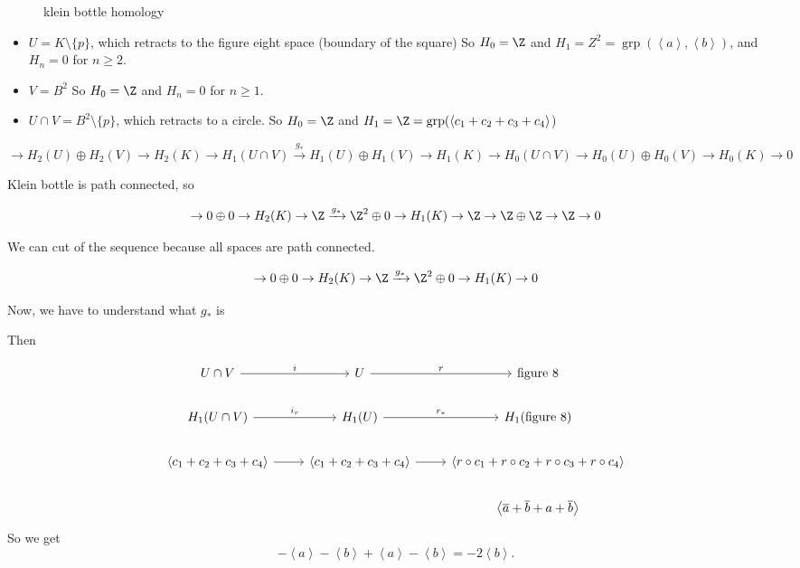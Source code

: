 \begin{figure}[H]
    \centering
    \caption{klein bottle homology}
    \label{fig:klein-bottle-homology}
\end{figure}

\begin{itemize}
    \item $U = K \setminus \{p\}$, which retracts to the figure eight space (boundary of the square)
        So $H_0 = \Z$ and $H_1  = Z^2 = \operatorname{grp}(\left<a \right>, \left<b \right>)$, and $H_n =0$ for  $n \ge  2$.
    \item $V = B^2$
        So $H_0 = \Z$ and $H_n = 0$ for  $n \ge 1 $.
    \item $U \cap V = B^2 \setminus \{p\}$, which retracts to a circle.
        So $H_0 = \Z$ and $H_1 = \Z = \operatorname{grp}(\left<c_1 + c_2 + c_3 + c_4\right>$)
\end{itemize}

\centerline{$
            \to  H_2(U) \oplus H_2(V) \to  H_2(K) \to  H_1(U \cap V) \xrightarrow{g_*}   H_1(U) \oplus H_1(V) \to  H_1(K) \to  H_0(U \cap  V) \to  H_0(U) \oplus H_0(V) \to  H_0(K) \to  0
        $}

        Klein bottle is path connected,  so

        \[
                    \to  0 \oplus 0 \to  H_2(K) \to  \Z \xrightarrow{g_*}   \Z^2\oplus 0 \to  H_1(K) \to  \Z \to  \Z  \oplus \Z \to  \Z \to  0
        \]

        We can cut of the sequence  because all spaces are path connected.

        \[
                    \to  0 \oplus 0 \to  H_2(K) \to  \Z \xrightarrow{g_*}   \Z^2\oplus 0 \to  H_1(K) \to  0
        \]

        Now, we have to understand what $g_*$ is

        Then

        \[
            \begin{tikzcd}
                U \cap V \arrow[r, "i"] & U \arrow[r, "r"] & \text{figure 8}\\
                H_1(U \cap V) \arrow[r, "i_r"] & H_1(U) \arrow[r, "r_*"] & H_1(\text{figure 8})\\
                \left<c_1 + c_2 + c_3 + c_4 \right> \arrow[r, ""] & \left<c_1+ c_2 +c_3 +c_4 \right> \arrow[r, ""] & \left<r  \circ  c_1 + r  \circ  c_2 + r  \circ  c_3 + r  \circ  c_4 \right>\\
                                      && \left<\overline{a} + \overline{b} + a + \overline{b} \right>
            \end{tikzcd}
        \]
        So we get
        \[
        - \left<a \right> - \left<b \right> + \left<a \right> - \left<b \right> = - 2 \left<b \right>
        .\] 

